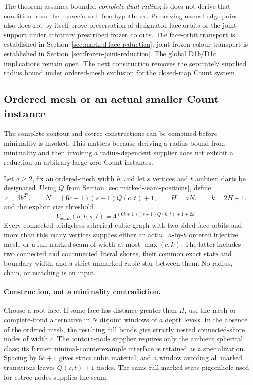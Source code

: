 The theorem assumes bounded \emph{complete dual radius}; it does not
derive that condition from the source's wall-free hypotheses.  Preserving
named edge pairs also does not by itself prove preservation of designated
face orbits or the joint support under arbitrary prescribed frozen colours.
The face-orbit transport is established in Section~\ref{sec:marked-face-reduction};
joint frozen-colour transport is established in Section~\ref{sec:frozen-joint-reduction}.
The global D1b/D1c implications remain open. The next construction removes the separately supplied radius bound
under ordered-mesh exclusion for the closed-map Count system.

\subsection{Ordered mesh or an actual smaller Count instance}
\label{sec:meshfree-full-seam}

The complete contour and cotree constructions can be combined before
minimality is invoked. This matters because deriving a radius bound from
minimality and then invoking a radius-dependent supplier does not exhibit
a reduction on arbitrary large zero-Count instances.

Let $a\geq2$, fix an ordered-mesh width $b$, and let $s$ vertices and $t$
ambient darts be designated. Using $Q$ from
Section~\ref{sec:marked-seam-positions}, define
\[
 c=3b^{2^a},\qquad
 N=(6c+1)(s+1)Q(c,t)+1,\qquad H=aN,\qquad k=2H+1,
\]
and the explicit size threshold
\[
 V_{\mathrm{seam}}(a,b,s,t)
   =4^{(6k+1)(s+1)Q(k,t)+1+2k}.
\]
Every connected bridgeless spherical cubic graph with two-sided face
orbits and more than this many vertices supplies either an actual
$a$-by-$b$ ordered injective mesh, or a full marked seam of width at most
$\max(c,k)$. The latter includes two connected and coconnected literal
shores, their common exact state and boundary width, and a strict unmarked
cubic star between them. No radius, chain, or matching is an input.

\paragraph{Construction, not a minimality contradiction.}
Choose a root face. If some face has distance greater than $H$, use the
mesh-or-complete-bond alternative in $N$ disjoint windows of $a$ depth
levels. In the absence of the ordered mesh, the resulting full bonds
give strictly nested connected-shore nodes of width $c$.
The contour-node supplier requires only the ambient spherical class;
its former minimal-counterexample interface is retained as a specialization.
Spacing by $6c+1$ gives strict cubic material, and a window avoiding all
marked transitions leaves $Q(c,t)+1$ nodes. The same full marked-state
pigeonhole used for cotree nodes supplies the seam.

